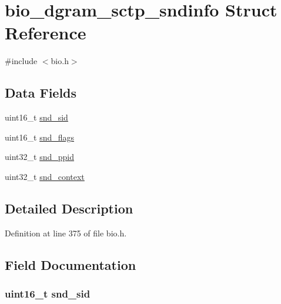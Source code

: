 \hypertarget{structbio__dgram__sctp__sndinfo}{}\section{bio\+\_\+dgram\+\_\+sctp\+\_\+sndinfo Struct Reference}
\label{structbio__dgram__sctp__sndinfo}


{\ttfamily \#include $<$bio.\+h$>$}

\subsection*{Data Fields}
\begin{DoxyCompactItemize}
\item 
uint16\+\_\+t \hyperlink{structbio__dgram__sctp__sndinfo_a7a1a5b32e1b51cc0007d4fdfd1e2c76d}{snd\+\_\+sid}
\item 
uint16\+\_\+t \hyperlink{structbio__dgram__sctp__sndinfo_a6b2033563132c7307da08930d1f9b523}{snd\+\_\+flags}
\item 
uint32\+\_\+t \hyperlink{structbio__dgram__sctp__sndinfo_a4dd98b36aa77d80206518a0241368f24}{snd\+\_\+ppid}
\item 
uint32\+\_\+t \hyperlink{structbio__dgram__sctp__sndinfo_a17163f1e8402428a51e080b38bf25467}{snd\+\_\+context}
\end{DoxyCompactItemize}


\subsection{Detailed Description}


Definition at line 375 of file bio.\+h.



\subsection{Field Documentation}
\subsubsection[{\texorpdfstring{snd\+\_\+sid}{snd_sid}}]{\setlength{\rightskip}{0pt plus 5cm}uint16\+\_\+t snd\+\_\+sid}\hypertarget{structbio__dgram__sctp__sndinfo_a7a1a5b32e1b51cc0007d4fdfd1e2c76d}{}\label{structbio__dgram__sctp__sndinfo_a7a1a5b32e1b51cc0007d4fdfd1e2c76d}



